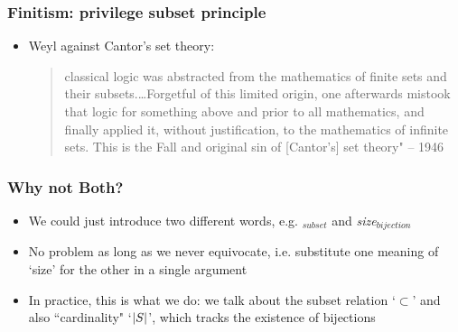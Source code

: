 \begin{frame}
\frametitle{Finitism: privilege subset principle}

\begin{itemize}[<+->]

\item Weyl against Cantor's set theory:

\begin{quote}
classical logic was abstracted from the mathematics of finite sets and their subsets.\dots Forgetful of this limited origin, one afterwards mistook that logic for something above and prior to all mathematics, and finally applied it, without justification, to the mathematics of infinite sets. This is the Fall and original sin of [Cantor's] set theory" -- 1946
\end{quote}

\end{itemize}
\end{frame}

\begin{frame}
\frametitle{Why not Both?}

\begin{itemize}[<+->]

\item We could just introduce two different words, e.g. $_{subset}$ and \emph{size}$_{bijection}$

\item No problem as long as we never equivocate, i.e. substitute one meaning of `size' for the other in a single argument

\item In practice, this is what we do: we talk about the subset relation `$\subset$' and also ``cardinality" `$\left| S \right|$', which tracks the existence of bijections

\end{itemize}
\end{frame}

